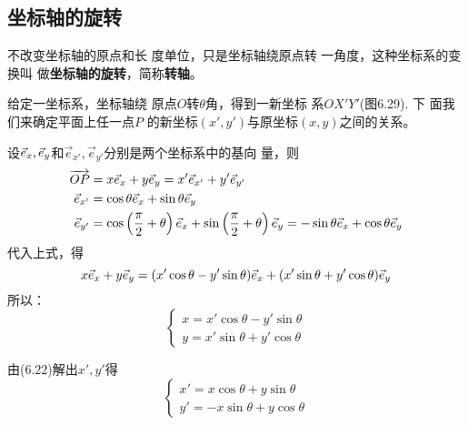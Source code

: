 \subsection{坐标轴的旋转}
不改变坐标轴的原点和长
度单位，只是坐标轴绕原点转
一角度，这种坐标系的变换叫
做\textbf{坐标轴的旋转}，简称\textbf{转轴}。

给定一坐标系，坐标轴绕
原点$O$转$\theta$角，得到一新坐标
系$OX'Y'$(图6.29). 下
面我们来确定平面上任一点$P$
的新坐标$(x',y')$与原坐标$(x,y)$之间的关系。

\begin{figure}[htp]
    \centering
    \caption{}
\end{figure}

设$\vec{e}_x,\vec{e}_y$和$\vec{e}_{x'},\vec{e}_{y'}$分别是两个坐标系中的基向
量，则
\[\begin{split}
    \overrightarrow{OP}&=x\vec{e}_x+y\vec{e}_y=x'\vec{e}_{x'}+y'\vec{e}_{y'}\\
    \vec{e}_{x'}&=\cos\theta \vec{e}_x+\sin\theta\vec{e}_y\\
    \vec{e}_{y'}&=\cos\left(\dfrac{\pi}{2}+\theta\right)\vec{e}_x+\sin\left(\dfrac{\pi}{2}+\theta\right)\vec{e}_y=-\sin\theta\vec{e}_x+\cos\theta\vec{e}_y
\end{split}\]
代入上式，得
\[x\vec{e}_x+y\vec{e}_y=(x'\cos\theta-y'\sin\theta)\vec{e}_x+(x'\sin\theta+y'\cos\theta)\vec{e}_y\]
所以：
\begin{equation}
    \boxed{\begin{cases}
        x=x'\cos\theta-y'\sin\theta\\
        y=x'\sin\theta+y'\cos\theta
    \end{cases}}
\end{equation}

由(6.22)解出$x',y'$得
\begin{equation}
    \boxed{\begin{cases}
        x'=x\cos\theta+y\sin\theta\\
        y'=-x\sin\theta+y\cos\theta
    \end{cases}}
\end{equation}

